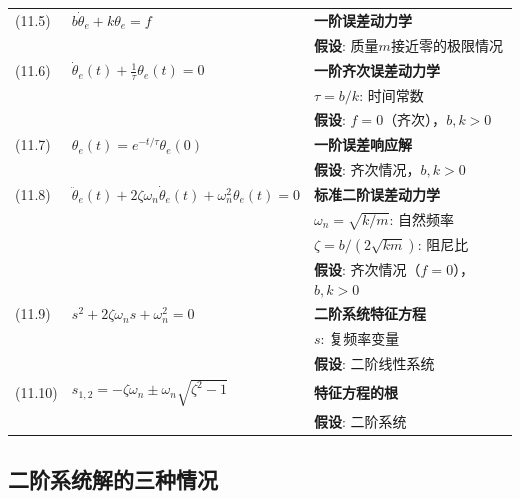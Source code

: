 \documentclass[12pt,a4paper]{article}
\begin{document}
\begin{longtable}{|p{}|p{}|p{}|}
(11.5) & $b\dot{\theta}_e + k\theta_e = f$ & 
\textbf{一阶误差动力学} \\
& & \textbf{假设}: 质量$m$接近零的极限情况 \\
\hline

(11.6) & $\dot{\theta}_e(t) + \frac{1}{\tau}\theta_e(t) = 0$ & 
\textbf{一阶齐次误差动力学} \\
& & $\tau = b/k$: 时间常数 \\
& & \textbf{假设}: $f = 0$（齐次），$b, k > 0$ \\
\hline

(11.7) & $\theta_e(t) = e^{-t/\tau}\theta_e(0)$ & 
\textbf{一阶误差响应解} \\
& & \textbf{假设}: 齐次情况，$b, k > 0$ \\
\hline

(11.8) & $\ddot{\theta}_e(t) + 2\zeta\omega_n \dot{\theta}_e(t) + \omega_n^2 \theta_e(t) = 0$ & 
\textbf{标准二阶误差动力学} \\
& & $\omega_n = \sqrt{k/m}$: 自然频率 \\
& & $\zeta = b/(2\sqrt{km})$: 阻尼比 \\
& & \textbf{假设}: 齐次情况（$f = 0$），$b, k > 0$ \\
\hline

(11.9) & $s^2 + 2\zeta\omega_n s + \omega_n^2 = 0$ & 
\textbf{二阶系统特征方程} \\
& & $s$: 复频率变量 \\
& & \textbf{假设}: 二阶线性系统 \\
\hline

(11.10) & $s_{1,2} = -\zeta\omega_n \pm \omega_n\sqrt{\zeta^2 - 1}$ & 
\textbf{特征方程的根} \\
& & \textbf{假设}: 二阶系统 \\
\hline

\end{longtable}

\subsection{二阶系统解的三种情况}
\end{document}
